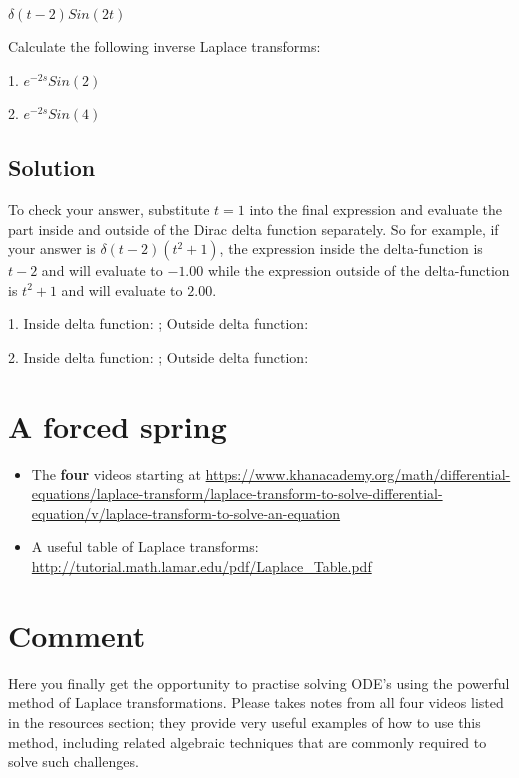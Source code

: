 $\displaystyle \delta(t-2) Sin(2t)$

Calculate the following inverse Laplace transforms:

1. $\displaystyle e^{-2s} Sin(2)$

2. $\displaystyle e^{-2s} Sin(4)$

\subsection*{Solution}
To check your answer, substitute $t=1$ into the final expression and evaluate the part inside and outside of the Dirac delta function separately. So for example, if your answer is $\delta(t-2) (t^2+1)$, the expression inside the delta-function is $t-2$ and will evaluate to $-1.00$ while the expression outside of the delta-function is $t^2+1$ and will evaluate to $2.00$.

1. Inside delta function: ; Outside delta function: 

2. Inside delta function: ; Outside delta function: 




\newpage
\section{A forced spring}

\begin{itemize}
    \item The \textbf{four} videos starting at \url{https://www.khanacademy.org/math/differential-equations/laplace-transform/laplace-transform-to-solve-differential-equation/v/laplace-transform-to-solve-an-equation}
    \item A useful table of Laplace transforms: \url{http://tutorial.math.lamar.edu/pdf/Laplace_Table.pdf}
\end{itemize}

\section*{Comment}
Here you finally get the opportunity to practise solving ODE's using the powerful method of Laplace transformations. Please takes notes from all four videos listed in the resources section; they provide very useful examples of how to use this method, including related algebraic techniques that are commonly required to solve such challenges.

